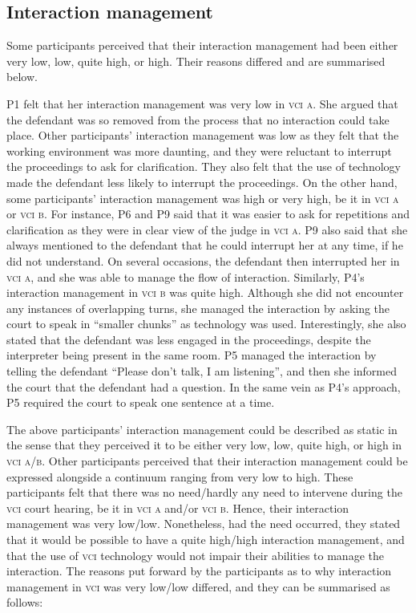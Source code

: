 \documentclass[output=paper]{langsci/langscibook}
\begin{document}
\subsection{Interaction management} 

Some participants perceived that their interaction management had been either very low, low, quite high, or high. Their reasons differed and are summarised below. 

P1 felt that her interaction management was very low in \textsc{vci a}. She argued that the defendant was so removed from the process that no interaction could take place. Other participants’ interaction management was low as they felt that the working environment was more daunting, and they were reluctant to interrupt the proceedings to ask for clarification. They also felt that the use of technology made the defendant less likely to interrupt the proceedings. On the other hand, some participants’ interaction management was high or very high, be it in \textsc{vci a} or \textsc{vci b}. For instance, P6 and P9 said that it was easier to ask for repetitions and clarification as they were in clear view of the judge in \textsc{vci a}. P9 also said that she always mentioned to the defendant that he could interrupt her at any time, if he did not understand. On several occasions, the defendant then interrupted her in \textsc{vci a}, and she was able to manage the flow of interaction. Similarly, P4’s interaction management in \textsc{vci b} was quite high. Although she did not encounter any instances of overlapping turns, she managed the interaction by asking the court to speak in “smaller chunks” as technology was used. Interestingly, she also stated that the defendant was less engaged in the proceedings, despite the interpreter being present in the same room. P5 managed the interaction by telling the defendant “Please don’t talk, I am listening”, and then she informed the court that the defendant had a question. In the same vein as P4’s approach, P5 required the court to speak one sentence at a time. 

The above participants’ interaction management could be described as static in the sense that they perceived it to be either very low, low, quite high, or high in \textsc{vci a\slash b}. Other participants perceived that their interaction management could be expressed alongside a continuum ranging from very low to high. These participants felt that there was no need/hardly any need to intervene during the \textsc{vci} court hearing, be it in \textsc{vci a} and/or \textsc{vci b}. Hence, their interaction management was very low/low. Nonetheless, had the need occurred, they stated that it would be possible to have a quite high/high interaction management, and that the use of \textsc{vci} technology would not impair their abilities to manage the interaction. The reasons put forward by the participants as to why interaction management in \textsc{vci} was very low/low differed, and they can be summarised as follows:
\end{document}
